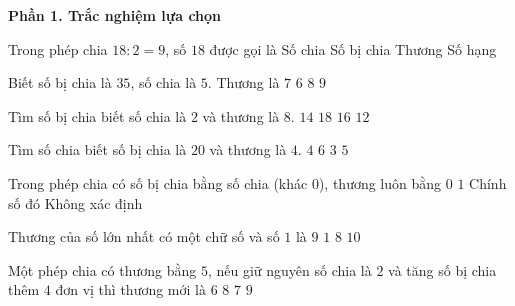 \textbf{Phần 1. Trắc nghiệm lựa chọn}

\begin{ex} %
Trong phép chia $18 : 2 = 9$, số $18$ được gọi là
\choice
{Số chia}
{\True Số bị chia}
{Thương}
{Số hạng}
\end{ex}

\begin{ex} %
Biết số bị chia là $35$, số chia là $5$. Thương là
\choice
{\True $7$}
{$6$}
{$8$}
{$9$}
\end{ex}

\begin{ex} %
Tìm số bị chia biết số chia là $2$ và thương là $8$.
\choice
{$14$}
{$18$}
{\True $16$}
{$12$}
\end{ex}

\begin{ex} %
Tìm số chia biết số bị chia là $20$ và thương là $4$.
\choice
{$4$}
{$6$}
{$3$}
{\True $5$}
\end{ex}

\begin{ex} %
Trong phép chia có số bị chia bằng số chia (khác 0), thương luôn bằng
\choice
{$0$}
{\True $1$}
{Chính số đó}
{Không xác định}
\end{ex}

\begin{ex} %
Thương của số lớn nhất có một chữ số và số $1$ là
\choice
{\True $9$}
{$1$}
{$8$}
{$10$}
\end{ex}

\begin{ex} %
Một phép chia có thương bằng $5$, nếu giữ nguyên số chia là $2$ và tăng số bị chia thêm $4$ đơn vị thì thương mới là
\choice
{$6$}
{$8$}
{\True $7$}
{$9$}
\end{ex}

